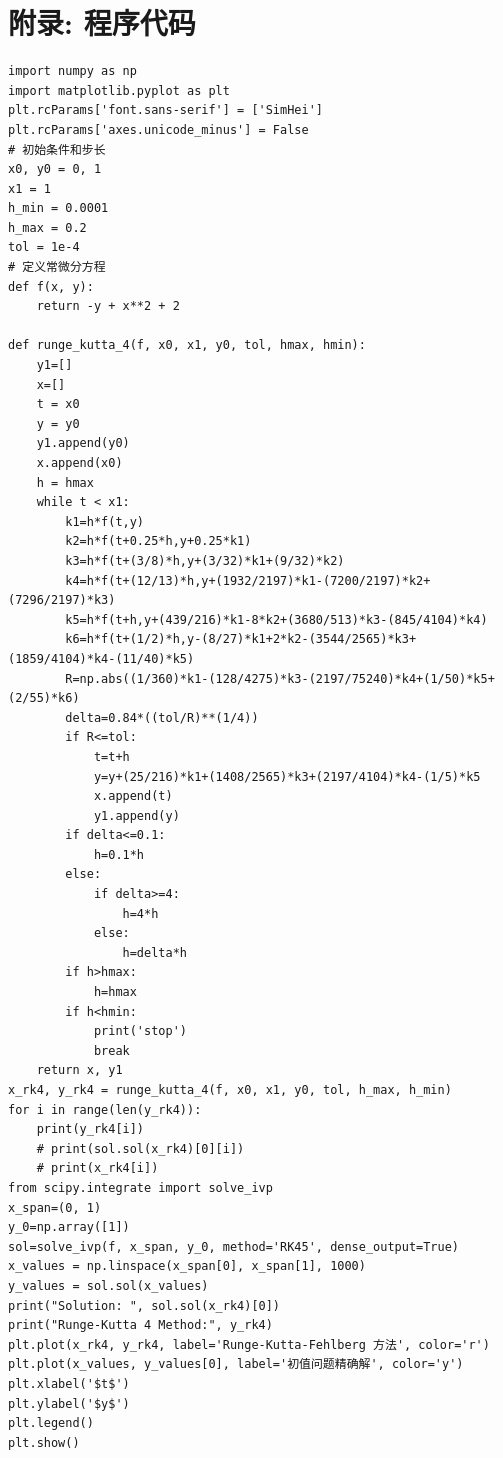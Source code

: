 \documentclass[UTF8,ctexart,a4paper,11pt,openany]{article}
\theoremstyle{definition}
\begin{document}
\section{附录: 程序代码}
\begin{lstlisting}[aboveskip=0pt]
import numpy as np
import matplotlib.pyplot as plt
plt.rcParams['font.sans-serif'] = ['SimHei']
plt.rcParams['axes.unicode_minus'] = False
# 初始条件和步长
x0, y0 = 0, 1
x1 = 1
h_min = 0.0001
h_max = 0.2
tol = 1e-4
# 定义常微分方程
def f(x, y):
    return -y + x**2 + 2

def runge_kutta_4(f, x0, x1, y0, tol, hmax, hmin):
    y1=[]
    x=[]
    t = x0
    y = y0
    y1.append(y0)
    x.append(x0)
    h = hmax
    while t < x1:
        k1=h*f(t,y)
        k2=h*f(t+0.25*h,y+0.25*k1)
        k3=h*f(t+(3/8)*h,y+(3/32)*k1+(9/32)*k2)
        k4=h*f(t+(12/13)*h,y+(1932/2197)*k1-(7200/2197)*k2+(7296/2197)*k3)
        k5=h*f(t+h,y+(439/216)*k1-8*k2+(3680/513)*k3-(845/4104)*k4)
        k6=h*f(t+(1/2)*h,y-(8/27)*k1+2*k2-(3544/2565)*k3+(1859/4104)*k4-(11/40)*k5)
        R=np.abs((1/360)*k1-(128/4275)*k3-(2197/75240)*k4+(1/50)*k5+(2/55)*k6)
        delta=0.84*((tol/R)**(1/4))
        if R<=tol:
            t=t+h
            y=y+(25/216)*k1+(1408/2565)*k3+(2197/4104)*k4-(1/5)*k5
            x.append(t)
            y1.append(y)
        if delta<=0.1:
            h=0.1*h
        else:
            if delta>=4:
                h=4*h
            else:
                h=delta*h
        if h>hmax:
            h=hmax
        if h<hmin:
            print('stop')
            break
    return x, y1
x_rk4, y_rk4 = runge_kutta_4(f, x0, x1, y0, tol, h_max, h_min)
for i in range(len(y_rk4)):
    print(y_rk4[i])
    # print(sol.sol(x_rk4)[0][i])
    # print(x_rk4[i])
from scipy.integrate import solve_ivp
x_span=(0, 1)
y_0=np.array([1])
sol=solve_ivp(f, x_span, y_0, method='RK45', dense_output=True)
x_values = np.linspace(x_span[0], x_span[1], 1000)
y_values = sol.sol(x_values)
print("Solution: ", sol.sol(x_rk4)[0])
print("Runge-Kutta 4 Method:", y_rk4)
plt.plot(x_rk4, y_rk4, label='Runge-Kutta-Fehlberg 方法', color='r')
plt.plot(x_values, y_values[0], label='初值问题精确解', color='y')
plt.xlabel('$t$')
plt.ylabel('$y$')
plt.legend()
plt.show()
    
\end{lstlisting}
\end{document}

